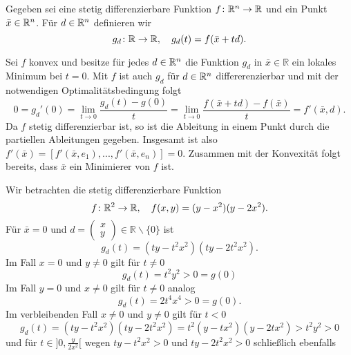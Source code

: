 
Gegeben sei eine stetig differenzierbare Funktion $f\colon \mathbb{R}^n\to\mathbb{R}$ und ein Punkt $\bar x\in\mathbb{R}^n$.
Für $d\in\mathbb{R}^n$ definieren wir
\begin{displaymath}
 g_d\colon \mathbb{R}\to\mathbb{R} , \quad g_d(t)=f(\bar x+td). 
\end{displaymath}
\begin{compactenum}[(i)]
 \item Sei $f$ konvex und besitze für jedes $d\in\mathbb{R}^n$ die Funktion $g_d$ in $\bar x\in\mathbb{R}$ ein lokales Minimum bei $t=0$.
 Mit $f$ ist auch $g_d$ für $d\in \mathbb{R}^n$ differerenzierbar und mit der notwendigen Optimalitätsbedingung folgt
 \begin{displaymath}
  0=g_d'(0)=\lim_{t\to 0} \frac{g_d(t)-g(0)}{t}=\lim_{t\to0}\frac{f(\bar x+td)-f(\bar x)}{t}=f'(\bar x,d).
 \end{displaymath}
 Da $f$ stetig differenzierbar ist, so ist die Ableitung in einem Punkt durch die partiellen Ableitungen gegeben.
 Insgesamt ist also $f'(\bar x)=[f'(\bar x,e_1),...,f'(\bar x,e_n)]=0$. Zusammen mit der Konvexität folgt bereits, dass $\bar x$ ein Minimierer von $f$ ist.
 \\
 \item Wir betrachten die stetig differenzierbare Funktion
 \begin{displaymath}
 f\colon \mathbb{R}^2\to\mathbb{R},\quad f(x,y)=(y-x^2)(y-2x^2).
 \end{displaymath}
 Für $\bar x=0$ und $d=\begin{pmatrix}x\\y\end{pmatrix}\in\mathbb{R}\backslash\{0\}$ ist 
 \begin{displaymath}
  g_d(t)=(ty-t^2x^2)(ty-2t^2x^2).
 \end{displaymath} 
 Im Fall $x=0$ und $y\neq 0$ gilt für $t\neq 0$
 \begin{displaymath}
  g_d(t)=t^2y^2>0=g(0)
 \end{displaymath}
 Im Fall $y=0$ und $x\neq 0$ gilt für $t\neq 0$ analog
 \begin{displaymath}
   g_d(t)=2t^4x^4>0=g(0).
 \end{displaymath}
Im verbleibenden Fall $x\neq 0$ und $y\neq 0$ gilt für $t<0$
 \begin{displaymath}
   g_d(t)=(ty-t^2x^2)(ty-2t^2x^2)=t^2(y-tx^2)(y-2tx^2)>t^2y^2>0
 \end{displaymath}
und für $t\in]0,\frac{y}{2x^2}[$ wegen $ty-t^2x^2>0$ und $ty-2t^2x^2>0$ schließlich ebenfalls

\end{compactenum}
